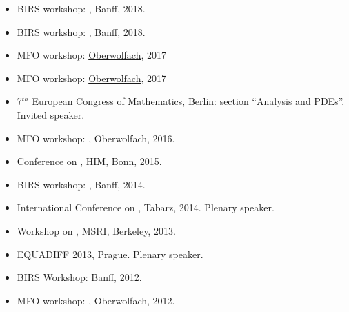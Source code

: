 \documentclass[reqno,11pt]{article}
\theoremstyle{plain}
\begin{document}
\begin{itemize}[topsep=-0.5\parsep,itemsep=-4pt,leftmargin=*]
\item BIRS workshop:
  \href{https://www.birs.ca/events/2018/5-day-workshops/18w5094}{}, Banff, 2018.
\item BIRS workshop: \href{https://www.birs.ca/events/2018/5-day-workshops/18w5069}{}, Banff, 2018.
\item MFO workshop: \href{https://publications.mfo.de/handle/mfo/3618}{ Oberwolfach}, 2017
\item MFO workshop: \href{https://publications.mfo.de/handle/mfo/3571}{ Oberwolfach}, 2017
\item  7$^{th}$ European Congress of Mathematics,
Berlin: section ``Analysis and PDEs''. Invited speaker.
\item MFO workshop: \href{https://publications.mfo.de/handle/mfo/3559}{}, Oberwolfach, 2016.
\item Conference on \href{https://wt.iam.uni-bonn.de/conference-new-trends-in-optimal-transport}{}, HIM, Bonn, 2015.
\item BIRS workshop: \href{https://www.birs.ca/events/2014/5-day-workshops/14w5109}{},
Banff, 2014.
\item International Conference on
, Tabarz, 2014.
Plenary
speaker.

\item Workshop on
  \href{https://www.msri.org/workshops/728}{},
MSRI, Berkeley, 2013.


\item EQUADIFF 2013, Prague. Plenary speaker.


\item BIRS Workshop: 
Banff, 2012.

\item MFO workshop: \href{https://publications.mfo.de/handle/mfo/3277}{},
Oberwolfach, 2012.


\end{itemize}
\end{document}
